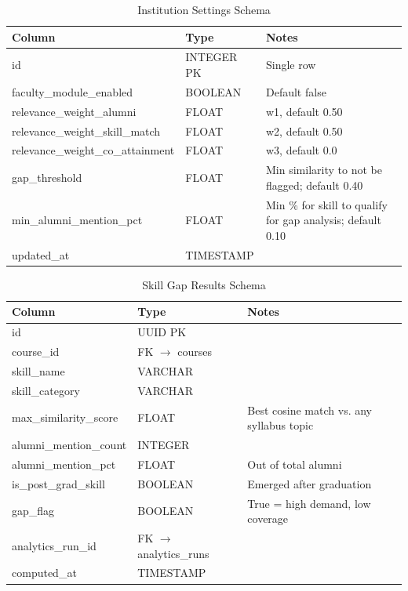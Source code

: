 {\begin{table}[h]
    \centering
    \caption{Institution Settings Schema}
    \begin{tabularx}{\textwidth}{|p{}|p{}|X|}
        \hline
        \textbf{Column} & \textbf{Type} & \textbf{Notes} \\ \hline
        id & INTEGER PK & Single row \\ \hline
        faculty\_module\_enabled & BOOLEAN & Default false \\ \hline
        relevance\_weight\_alumni & FLOAT & w1, default 0.50 \\ \hline
        relevance\_weight\_skill\_match & FLOAT & w2, default 0.50 \\ \hline
        relevance\_weight\_co\_attainment & FLOAT & w3, default 0.0 \\ \hline
        gap\_threshold & FLOAT & Min similarity to not be flagged; default 0.40 \\ \hline
        min\_alumni\_mention\_pct & FLOAT & Min \% for skill to qualify for gap analysis; default 0.10 \\ \hline
        updated\_at & TIMESTAMP & \\ \hline
    \end{tabularx}
\end{table}

\begin{table}[h]
    \centering
    \caption{Skill Gap Results Schema}
    \begin{tabularx}{\textwidth}{|p{}|p{}|X|}
        \hline
        \textbf{Column} & \textbf{Type} & \textbf{Notes} \\ \hline
        id & UUID PK & \\ \hline
        course\_id & FK $\rightarrow$ courses & \\ \hline
        skill\_name & VARCHAR & \\ \hline
        skill\_category & VARCHAR & \\ \hline
        max\_similarity\_score & FLOAT & Best cosine match vs. any syllabus topic \\ \hline
        alumni\_mention\_count & INTEGER & \\ \hline
        alumni\_mention\_pct & FLOAT & Out of total alumni \\ \hline
        is\_post\_grad\_skill & BOOLEAN & Emerged after graduation \\ \hline
        gap\_flag & BOOLEAN & True = high demand, low coverage \\ \hline
        analytics\_run\_id & FK $\rightarrow$ analytics\_runs & \\ \hline
        computed\_at & TIMESTAMP & \\ \hline
    \end{tabularx}
\end{table}

}
